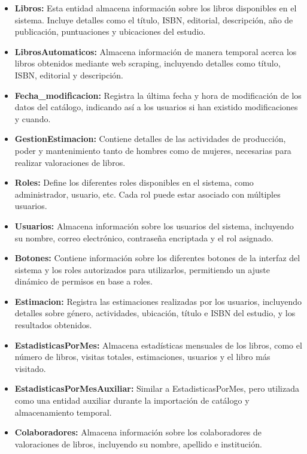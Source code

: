 \begin{itemize}
    \item \textbf{Libros:} Esta entidad almacena información sobre los libros disponibles en el sistema. Incluye detalles como el título, ISBN, editorial, descripción, año de publicación, puntuaciones y ubicaciones del estudio.
    \item \textbf{LibrosAutomaticos:} Almacena información de manera temporal acerca los libros obtenidos mediante web scraping, incluyendo detalles como título, ISBN, editorial y descripción.
    \item \textbf{Fecha\_modificacion:} Registra la última fecha y hora de modificación de los datos del catálogo, indicando así a los usuarios si han existido modificaciones y cuando.
    \item \textbf{GestionEstimacion:} Contiene detalles de las actividades de producción, poder y mantenimiento tanto de hombres como de mujeres, necesarias para realizar valoraciones de libros.
    \item \textbf{Roles:} Define los diferentes roles disponibles en el sistema, como administrador, usuario, etc. Cada rol puede estar asociado con múltiples usuarios.
    \item \textbf{Usuarios:} Almacena información sobre los usuarios del sistema, incluyendo su nombre, correo electrónico, contraseña encriptada y el rol asignado.
    \item \textbf{Botones:} Contiene información sobre los diferentes botones de la interfaz del sistema y los roles autorizados para utilizarlos, permitiendo un ajuste dinámico de permisos en base a roles.
    \item \textbf{Estimacion:} Registra las estimaciones realizadas por los usuarios, incluyendo detalles sobre género, actividades, ubicación, título e ISBN del estudio, y los resultados obtenidos.
    \item \textbf{EstadisticasPorMes:} Almacena estadísticas mensuales de los libros, como el número de libros, visitas totales, estimaciones, usuarios y el libro más visitado.
    \item \textbf{EstadisticasPorMesAuxiliar:} Similar a EstadisticasPorMes, pero utilizada como una entidad auxiliar durante la importación de catálogo y almacenamiento temporal.
    \item \textbf{Colaboradores:} Almacena información sobre los colaboradores de valoraciones de libros, incluyendo su nombre, apellido e institución.
\end{itemize}


